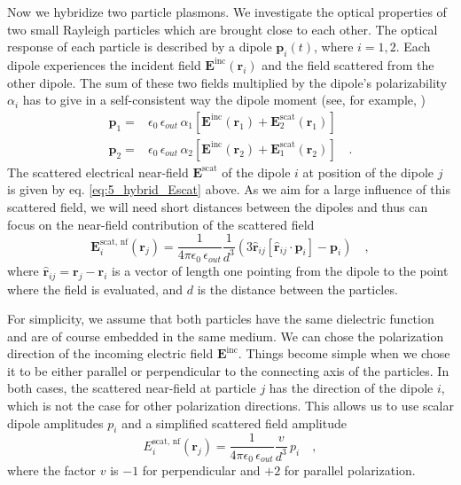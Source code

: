 Now we hybridize two particle plasmons. We investigate the optical properties of two small Rayleigh particles which are brought close to each other.  The optical response of each particle is described by  a dipole $ \mathbf{p}_i(t)$, where $i = 1,2$.
 Each dipole experiences the incident field
$\mathbf{E}^{\text{inc}}(\mathbf{r}_i)$ and the field scattered from the other dipole.
The sum of these two fields multiplied by the dipole's polarizability $\alpha_i$
has to give in a self-consistent way the dipole moment (see, for example, \cite{Myroshnychenko08})
%
\begin{align} \label{eq:5_hbyrid_equationsystem}
     \mathbf{p}_1 = &  \epsilon_0 \,  \epsilon_{out} \,  \alpha_1 \left[ \mathbf{E}^{\text{inc}} (\mathbf{r}_1) +
\mathbf{E}^{\text{scat}}_2(\mathbf{r}_1) \right] \\
  \mathbf{p}_2 = &  \epsilon_0 \,  \epsilon_{out} \,  \alpha_2 \left[ \mathbf{E}^{\text{inc}} (\mathbf{r}_2) +
\mathbf{E}^{\text{scat}}_1(\mathbf{r}_2) \right]  \quad . \nonumber
\end{align}
%
The scattered electrical near-field $ \mathbf{E}^{\text{scat}}$ of the dipole $i$ at position of the dipole $j$ is given by eq.   \ref{eq:5_hybrid_Escat} above. As we aim  for a large influence of this scattered field, we will need short distances between the dipoles and thus can focus on the near-field contribution of the scattered field
\begin{equation}
  \mathbf{E}^{\text{scat, nf}}_i(\mathbf{r}_j) = \frac{ 1 }{4\pi\epsilon_0 \, \epsilon_{out}}  \frac{1}{d^3}
        \left( 3\hat{\mathbf{r}}_{ij} \left[\hat{\mathbf{r}}_{ij} \cdot \mathbf{p}_i \right] - \mathbf{p}_i \right)
  \quad ,
\end{equation}
where $\hat{\mathbf{r}}_{ij}   = \mathbf{r} _j - \mathbf{r} _i$ is a vector of length one pointing from the dipole to the point where
the field is evaluated, and $d$ is the distance between the particles.


For simplicity, we assume that both particles have the same dielectric function and are of course embedded in the same medium. 
We  can chose the polarization direction of the incoming electric field  $\mathbf{E}^{\text{inc}}$. Things become simple when we chose it to be either parallel or perpendicular to the connecting axis of the particles. In both cases, the scattered near-field at particle $j$ has the direction of the dipole $i$, which is not the case for other polarization directions. This allows us to use scalar dipole amplitudes $p_i$ and a simplified scattered field amplitude
\begin{equation}
  {E}^{\text{scat, nf}}_i(\mathbf{r}_j) = \frac{ 1 }{4\pi\epsilon_0 \, \epsilon_{out}}  \frac{v}{d^3} \, p_i 
  \quad ,
\end{equation}
where the factor $v$ is $-1$ for perpendicular and $+2$ for parallel polarization.


